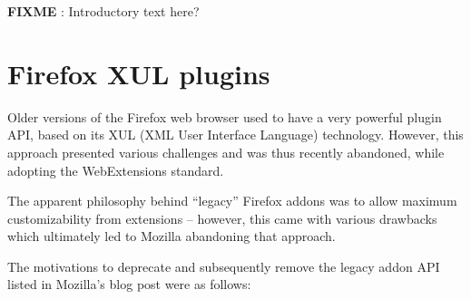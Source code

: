 \documentclass[a4paper,parskip=full]{scrreprt}
\newcommand{\fixme}[1]{\textbf{FIXME} \emph{#1}}
\begin{document}
\fixme{}: Introductory text here?

\section{Firefox XUL plugins}

Older versions of the Firefox web browser used to have a very powerful plugin
API, based on its XUL (XML User Interface Language) technology. However, this
approach presented various challenges and was thus recently abandoned, while
adopting the WebExtensions standard.

The apparent philosophy behind ``legacy'' Firefox addons was to allow maximum
customizability from extensions -- however, this came with various drawbacks
which ultimately led to Mozilla abandoning that approach.

The motivations to deprecate and subsequently remove the legacy addon API listed
in Mozilla's blog post \citep{mozilla-webext} were as follows:
\end{document}
